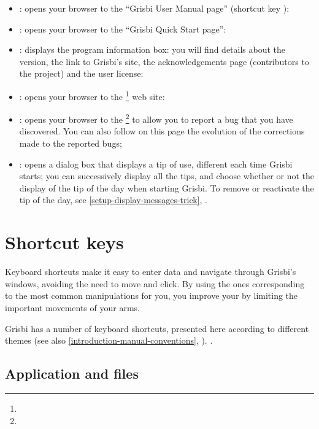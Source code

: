 \begin{itemize}
	\item {}: opens your browser to the  \enquote{Grisbi User Manual page} (shortcut key  ):
	\item {}: opens your browser to the  \enquote{Grisbi Quick Start page}:
	\item {}: displays the program information box: you will find details about the version, the link to Grisbi's site, the acknowledgements page (contributors to the project) and the user license:
	\item {}: opens your browser to the \footnote{\urlGrisbi{}} web site:
	\item {}: opens your browser to the \footnote{\urlBugTracker{}} to allow you to report a bug that you have discovered. You can also follow on this page the evolution of the corrections made to the reported bugs;
	\item {}: opens a dialog box that displays a tip of use, different each time Grisbi starts; you can successively display all the tips, and choose whether or not the display of the tip of the day when starting Grisbi. To remove or reactivate the tip of the day, see \vref{setup-display-messages-trick}, .
\end{itemize}


\section{Shortcut keys\label{home-shortcuts}}


Keyboard shortcuts make it easy to enter data and navigate through Grisbi's windows, avoiding the need to move and click. By using the ones corresponding to the most common manipulations for you, you improve your  by limiting the important movements of your arms.
 
Grisbi has a number of keyboard shortcuts, presented here according to different themes (see also  \vref{introduction-manual-conventions}, ).
.

\subsection{Application and files}

